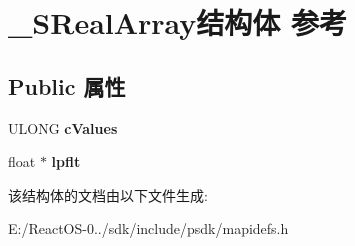 \hypertarget{struct___s_real_array}{}\section{\+\_\+\+S\+Real\+Array结构体 参考}
\label{struct___s_real_array}
\subsection*{Public 属性}
\begin{DoxyCompactItemize}
\item 
\mbox{\label{struct___s_real_array_a3497ac0f342ff0f1f65ca6bd51e3d8da}} 
U\+L\+O\+NG {\bfseries c\+Values}
\item 
\mbox{\label{struct___s_real_array_a0e32bfaf71aca72e0a24873ad101e579}} 
float $\ast$ {\bfseries lpflt}
\end{DoxyCompactItemize}


该结构体的文档由以下文件生成\+:\begin{DoxyCompactItemize}
\item 
E\+:/\+React\+O\+S-\/0../sdk/include/psdk/mapidefs.\+h\end{DoxyCompactItemize}
